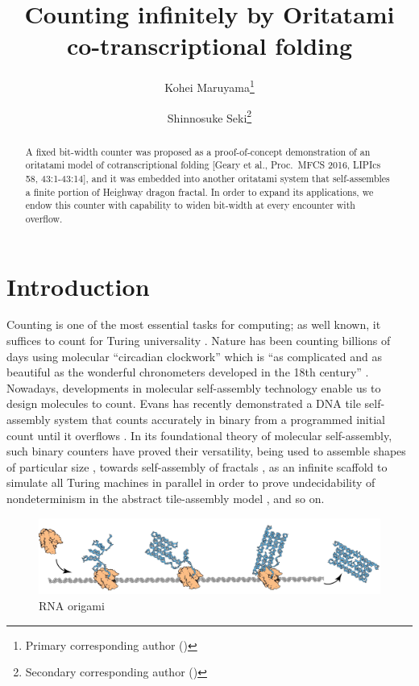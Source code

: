 \documentclass[runningheads]{llncs}
\title{Counting infinitely by Oritatami co-transcriptional folding}
\author{
Kohei Maruyama\inst{1}\thanks{Primary corresponding author (\email{k.maruyama@uec.ac.jp})} \and
Shinnosuke Seki\inst{1}\thanks{Secondary corresponding author (\email{s.seki@uec.ac.jp})}
}
\institute{
The University of Electro-Communications, 
1-5-1 Chofugaoka, Chofu, Tokyo, 1828585, Japan \\
}
\begin{document}
\maketitle

\begin{abstract}
A fixed bit-width counter was proposed as a proof-of-concept demonstration of an oritatami model of cotranscriptional folding [Geary et al., Proc.~MFCS 2016, LIPIcs 58, 43:1-43:14], and it was embedded into another oritatami system that self-assembles a finite portion of Heighway dragon fractal. 
In order to expand its applications, we endow this counter with capability to widen bit-width at every encounter with overflow. 
\end{abstract}

	\section{Introduction}

Counting is one of the most essential tasks for computing; as well known, it suffices to count for Turing universality \cite{Minsky1967}. 
Nature has been counting billions of days using molecular ``circadian clockwork'' which is ``as complicated and as beautiful as the wonderful chronometers developed in the 18th century''  \cite{McClung2006}. 
Nowadays, developments in molecular self-assembly technology enable us to design molecules to count. 
Evans has recently demonstrated a DNA tile self-assembly system that counts accurately in binary from a programmed initial count until it overflows \cite{EvansPhD}. 
In its foundational theory of molecular self-assembly, such binary counters have proved their versatility, being used to assemble shapes of particular size \cite{AdChGoHu2001,RothemundWinfree2000}, towards self-assembly of fractals \cite{MasudaSekiUbukata2018}, as an infinite scaffold to simulate all Turing machines in parallel in order to prove undecidability of nondeterminism in the abstract tile-assembly model \cite{BrChDoKaSe2013}, and so on. 

\begin{figure}[tb]
\centering
\includegraphics[width=\linewidth]{fig/rna_origami.pdf}
\caption{RNA origami}
\label{fig:rna_origami}
\end{figure}
\end{document}
